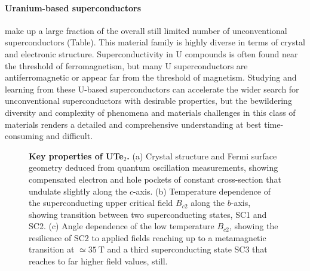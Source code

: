 

\paragraph{Uranium-based superconductors} make up a large fraction of the overall still limited number of unconventional superconductors (Table). This material family is highly diverse in terms of crystal and electronic structure. Superconductivity in U compounds is often found near the threshold of ferromagnetism, but many U superconductors are antiferromagnetic or appear far from the threshold of magnetism. 
Studying and learning from these U-based superconductors can accelerate the wider search for unconventional superconductors with desirable properties, but the bewildering diversity and complexity of phenomena and materials challenges in this class of materials renders a detailed and comprehensive understanding at best time-consuming and difficult. 

\begin{figure}
  \caption{{\bf Key properties of UTe$_2$.} (a) Crystal structure and Fermi surface geometry deduced from quantum oscillation measurements, showing compensated electron and hole pockets of constant cross-section that undulate slightly along the $c$-axis. (b) Temperature dependence of the superconducting upper critical field $B_{c2}$ along the $b$-axis, showing transition between two superconducting states, SC1 and SC2. (c) Angle dependence of the low temperature $B_{c2}$, showing the resilience of SC2 to applied fields reaching up to a metamagnetic transition at $\simeq \SI{35}{\tesla}$ and a third superconducting state SC3 that reaches to far higher field values, still.}
  \label{fig:UTe2}
\end{figure}

